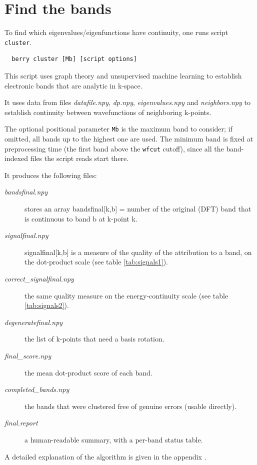 \documentclass[a4paper,12pt]{report}
\begin{document}
\section{Find the bands}
To find which eigenvalues/eigenfunctions have continuity, one runs script \texttt{cluster}.

\begin{verbatim}
  berry cluster [Mb] [script options]
\end{verbatim}

This script uses graph theory and unsupervised machine learning to establish electronic bands
that are analytic in k-space.

It uses data from files \emph{datafile.npy}, \emph{dp.npy}, \emph{eigenvalues.npy} and
\emph{neighbors.npy} to establish continuity between wavefunctions of neighboring k-points.

The optional positional parameter \texttt{Mb} is the maximum band to consider; if omitted, all
bands up to the highest one are used. The minimum band is fixed at preprocessing time (the first
band above the \texttt{wfcut} cutoff), since all the band-indexed files the script reads start there.

 It produces the following files:
 \begin{description}
   \item[\emph{bandsfinal.npy}] stores an array bandsfinal[k,b] = number of the original (DFT) band that is continuous to band b at k-point k.
   \item[\emph{signalfinal.npy}] signalfinal[k,b] is a measure of the quality of the attribution to a band, on the dot-product scale (see table \ref{tab:signals1}).
   \item[\emph{correct\_signalfinal.npy}] the same quality measure on the energy-continuity scale (see table \ref{tab:signals2}).
   \item[\emph{degeneratefinal.npy}] the list of k-points that need a basis rotation.
   \item[\emph{final\_score.npy}] the mean dot-product score of each band.
   \item[\emph{completed\_bands.npy}] the bands that were clustered free of genuine errors (usable directly).
   \item[\emph{final.report}] a human-readable summary, with a per-band status table.
 \end{description}

 A detailed explanation of the algorithm is given in the appendix .
\end{document}
